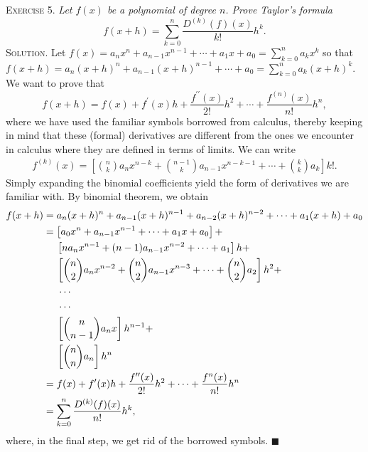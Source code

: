\documentclass[11pt, leqno]{article}
\newcommand{\done}{\ensuremath{\blacksquare}}
\begin{document}
\textsc{Exercise 5}. \emph{Let $f(x)$ be a polynomial of degree $n$. Prove Taylor's formula 
\begin{displaymath}
f(x+h) = \sum_{k=0}^n \frac{D^{(k)}(f)(x)}{k!} h^k.
\end{displaymath}}\textsc{Solution}. Let $f(x) = a_nx^n + a_{n-1}x^{n-1} + \cdots + a_1x + a_0 = \sum_{k=0}^n a_kx^k$ so that $f(x+h) = a_n(x+h)^n + a_{n-1}(x+h)^{n-1} + \cdots + a_0 = \sum_{k=0}^n a_k(x+h)^k$. We want to prove that 
\begin{displaymath}
f(x+h) = f(x) + f^{\prime}(x)h + \frac{f^{\prime\prime}(x)}{2!}h^2 + \cdots + \frac{f^{(n)}(x)}{n!}h^n,
\end{displaymath}
where we have used the familiar symbols borrowed from calculus, thereby keeping in mind that these (formal) derivatives are different from the ones we encounter in calculus where they are defined in terms of limits. We can write 
\begin{align*}
f^{(k)}(x) = \left[\binom{n}{k} a_nx^{n-k} + \binom{n-1}{k}a_{n-1} x^{n-k-1} + \cdots + \binom{k}{k}a_k \right]k!.
\end{align*}
Simply expanding the binomial coefficients yield the form of derivatives we are familiar with. By binomial theorem, we obtain
\begin{align*}
  f(x+h) &= a_n(x+h)^n + a_{n-1}(x+h)^{n-1} + a_{n-2}(x+h)^{n-2} + \cdots + a_1(x+h) + a_0 \\
         &= \left[ a_0x^n + a_{n-1}x^{n-1} + \cdots + a_1x + a_0 \right] + \\
         &\hspace{4.5mm} \left[n a_nx^{n-1} + (n-1)a_{n-1}x^{n-2} + \cdots + a_1 \right] h + \\
         &\hspace{4.5mm} \left[ \binom{n}{2}a_nx^{n-2} + \binom{n}{2} a_{n-1}x^{n-3} + \cdots + \binom{n}{2} a_2  \right] h^2 + \\
         &\hspace{5mm} \cdots \\
         &\hspace{5mm} \cdots \\
         &\hspace{4.5mm} \left[ \binom{n}{n-1}a_nx \right] h^{n-1} + \\
         &\hspace{4.5mm} \left[\binom{n}{n}a_n\right]h^n \\
         &= f(x) + f^{\prime}(x)h + \frac{f^{\prime\prime}(x)}{2!}h^2 + \cdots + \frac{f^n(x)}{n!} h^n \\
  &= \sum_{k=0}^n \frac{D^{(k)}(f)(x)}{n!}h^k,
\end{align*}
where, in the final step, we get rid of the borrowed symbols. \done
\end{document}
